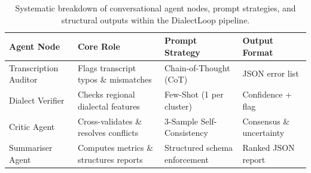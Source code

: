 
\begin{table}[h]
\centering
\small
\begin{tabular}{llll}
\toprule
\textbf{Agent Node} & \textbf{Core Role} & \textbf{Prompt Strategy} & \textbf{Output Format} \\
\midrule
Transcription Auditor & Flags transcript typos \& mismatches & Chain-of-Thought (CoT) & JSON error list \\
Dialect Verifier & Checks regional dialectal features & Few-Shot (1 per cluster) & Confidence + flag \\
Critic Agent & Cross-validates \& resolves conflicts & 3-Sample Self-Consistency & Consensus \& uncertainty \\
Summariser Agent & Computes metrics \& structures reports & Structured schema enforcement & Ranked JSON report \\
\bottomrule
\end{tabular}
\caption{Systematic breakdown of conversational agent nodes, prompt strategies, and structural outputs within the DialectLoop pipeline.}
\label{tab:agent_roles}
\end{table}
